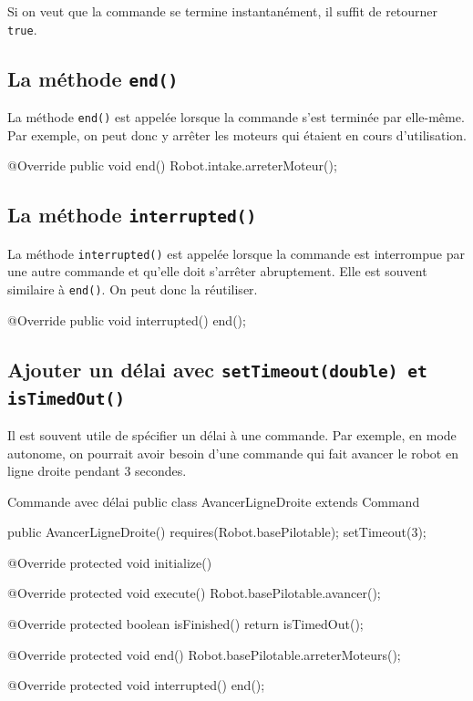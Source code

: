 \documentclass[12pt]{report}
\begin{document}
Si on veut que la commande se termine instantanément, il suffit de retourner \texttt{true}.

\subsection{La méthode \texttt{end()}}
La méthode \texttt{end()} est appelée lorsque la commande s'est terminée par elle-même. Par exemple, on peut donc y arrêter les moteurs qui étaient en cours d'utilisation.

\begin{code}
@Override
public void end() {
  Robot.intake.arreterMoteur();
}
\end{code}

\subsection{La méthode \texttt{interrupted()}}
La méthode \texttt{interrupted()} est appelée lorsque la commande est interrompue par une autre commande et qu'elle doit s'arrêter abruptement. Elle est souvent similaire à \texttt{end()}. On peut donc la réutiliser.

\begin{code}
@Override
public void interrupted() {
  end();
}
\end{code}

\subsection{Ajouter un délai avec \texttt{setTimeout(double) et \texttt{isTimedOut()}}}
Il est souvent utile de spécifier un délai à une commande. Par exemple, en mode autonome, on pourrait avoir besoin d'une commande qui fait avancer le robot en ligne droite pendant 3 secondes.

\begin{MyTCB}{Commande avec délai}
public class AvancerLigneDroite extends Command {
  
  public AvancerLigneDroite() {
    requires(Robot.basePilotable);
    setTimeout(3);
  }

  @Override
  protected void initialize() {
  }

  @Override
  protected void execute() {
    Robot.basePilotable.avancer();
  }

  @Override
  protected boolean isFinished() {
    return isTimedOut();
  }

  @Override
  protected void end() {
    Robot.basePilotable.arreterMoteurs();
  }

  @Override
  protected void interrupted() {
    end();
  }
}
\end{MyTCB}
\end{document}
